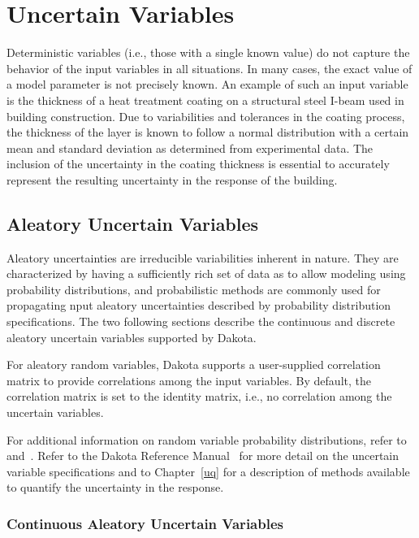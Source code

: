 \section{Uncertain Variables}\label{variables:uncertain}


Deterministic variables (i.e., those with a single known value) do not
capture the behavior of the input variables in all situations. In many
cases, the exact value of a model parameter is not precisely known. An
example of such an input variable is the thickness of a heat treatment
coating on a structural steel I-beam used in building construction.
Due to variabilities and tolerances in the coating process, the
thickness of the layer is known to follow a normal distribution with a
certain mean and standard deviation as determined from experimental
data. The inclusion of the uncertainty in the coating thickness is
essential to accurately represent the resulting uncertainty in the
response of the building.

\subsection{Aleatory Uncertain Variables}\label{variables:uncertain:auv}

Aleatory uncertainties are irreducible variabilities inherent in
nature.  They are characterized by having a sufficiently rich set of
data as to allow modeling using probability distributions, and
probabilistic methods are commonly used for propagating nput aleatory
uncertainties described by probability distribution specifications.
The two following sections describe the continuous and discrete
aleatory uncertain variables supported by Dakota.

For aleatory random variables, Dakota supports a user-supplied
correlation matrix to provide correlations among the input
variables. By default, the correlation matrix is set to the identity
matrix, i.e., no correlation among the uncertain variables.

For additional information on random variable probability
distributions, refer to~\cite{Hal00} and~\cite{Swi04}. Refer to the Dakota
Reference Manual~\cite{RefMan} for more detail on the uncertain variable
specifications and to Chapter~\ref{uq} for a description of methods
available to quantify the uncertainty in the response.

\subsubsection{Continuous Aleatory Uncertain Variables}\label{variables:uncertain:cauv}

